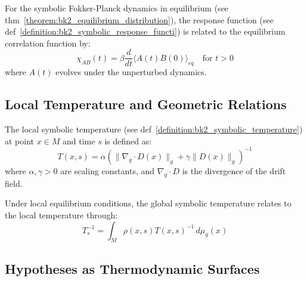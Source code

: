 \begin{theorem} 
\label{thm:bk2_symbolic_fluctuation_dissipation_relation} 
For the symbolic Fokker-Planck dynamics in equilibrium (see thm~\ref{theorem:bk2_equilibrium_distribution}), the response function (see def~\ref{definition:bk2_symbolic_response_functi}) is related to the equilibrium correlation function by:
\[
\chi_{AB}(t) = \beta \frac{d}{dt}\langle A(t) B(0) \rangle_{eq} \quad \text{for } t > 0
\]
where $A(t)$ evolves under the unperturbed dynamics.
\end{theorem}

\subsection{Local Temperature and Geometric Relations}
\label{subsec:bk2_local_temperature_geometry}

\begin{definition} 
\label{definition:bk2_local_symbolic_temperature}
The local symbolic temperature (see def~\ref{definition:bk2_symbolic_temperature}) at point $x \in M$ and time $s$ is defined as:
\[
T(x,s) = \alpha \left( \|\nabla_g \cdot D(x)\|_g + \gamma \|D(x)\|_g \right)^{-1}
\]
where $\alpha, \gamma > 0$ are scaling constants, and $\nabla_g \cdot D$ is the divergence of the drift field.
\end{definition}

\begin{proposition} 
\label{prop:bk2_global_local_temp_relation} 
Under local equilibrium conditions, the global symbolic temperature relates to the local temperature through:
\[
T_s^{-1} = \int_M \rho(x,s) T(x,s)^{-1} \, d\mu_g(x)
\]
\end{proposition}

\subsection{Hypotheses as Thermodynamic Surfaces}
\label{subsec:bk2_hypotheses_thermodynamic_surfaces}

